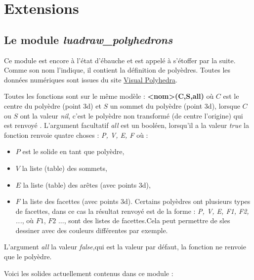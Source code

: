 \section{Extensions}

\subsection{Le module \emph{luadraw\_polyhedrons}}

Ce module est encore à l'état d'ébauche et est appelé à s'étoffer par la suite. Comme son nom l'indique, il contient la définition de polyèdres. Toutes les données numériques sont issues du site \href{https://dmccooey.com/polyhedra/}{Visual Polyhedra}.

Toutes les fonctions sont sur le même modèle : \textbf{<nom>(C,S,all)} où $C$ est le centre du polyèdre (point 3d) et $S$ un sommet du polyèdre (point 3d), lorsque $C$ ou $S$ ont la valeur \emph{nil}, c'est le polyèdre non transformé (de centre l'origine) qui est renvoyé . L'argument facultatif \emph{all} est un booléen, lorsqu'il a la valeur \emph{true} la fonction renvoie quatre choses : \emph{P, V, E, F} où :
    \begin{itemize}
        \item $P$ est le solide en tant que polyèdre,
        \item $V$ la liste (table) des sommets,
        \item $E$ la liste (table) des arêtes (avec points 3d),
        \item $F$ la liste des facettes (avec points 3d). Certains polyèdres ont plusieurs types de facettes, dans ce cas la résultat renvoyé est de la forme : \emph{P, V, E, F1, F2, ...}, où $F1$, $F2$ ..., sont des listes de facettes.Cela peut permettre de sles dessiner avec des couleurs différentes par exemple.
        \end{itemize}
L'argument \emph{all} la valeur \emph{false},qui est la valeur par défaut, la fonction ne renvoie que le polyèdre.

Voici les solides actuellement contenus dans ce module :

